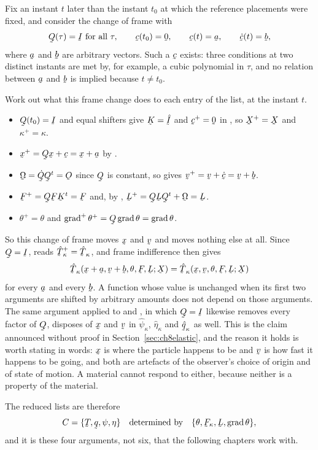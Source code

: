\begin{remark}\label{rem:ch8noxv}
Fix an instant $t$ later than the instant $t_{0}$ at which the reference
placements were fixed, and consider the change of frame with
\[
   \bQ(\tau)=\I\ \text{for all }\tau,
   \qquad
   \bc(t_{0})=\bze,\qquad
   \bc(t)=\ba,\qquad
   \dot\bc(t)=\bb ,
\]
where $\ba$ and $\bb$ are arbitrary vectors. Such a $\bc$ exists: three
conditions at two distinct instants are met by, for example, a cubic
polynomial in $\tau$, and no relation between $\ba$ and $\bb$ is
implied because $t\neq t_{0}$.

Work out what this frame change does to each entry of the list, at the
instant $t$.
\begin{itemize}\itemsep1pt
\item $\bQ(t_{0})=\I$ and equal shifters give $\bK=\hI$ and
      $\bc^{+}=\bze$ in , so $\bX^{+}=\bX$ and
      $\kappa^{+}=\kappa$.
\item $\bx^{+}=\bQ\bx+\bc=\bx+\ba$ by .
\item $\bOm=\dot\bQ\bQ^{t}=\Ob$ since $\bQ$ is constant, so 
      gives $\bv^{+}=\bv+\dot\bc=\bv+\bb$.
\item $\bF^{+}=\bQ\bF\bK^{t}=\bF$ and, by ,
      $\bL^{+}=\bQ\bL\bQ^{t}+\bOm=\bL$.
\item $\theta^{+}=\theta$ and $\grad^{+}\theta^{+}=\bQ\grad\theta
      =\grad\theta$.
\end{itemize}
So this change of frame moves $\bx$ and $\bv$ and moves nothing else at
all. Since $\bQ=\I$,  reads $\hat\bT^{+}_{\kappa}=
\hat\bT_{\kappa}$, and frame indifference then gives
\[
   \hat\bT_{\kappa}(\bx+\ba,\bv+\bb,\theta,\bF,\bL;\bX)
   =\hat\bT_{\kappa}(\bx,\bv,\theta,\bF,\bL;\bX)
\]
for every $\ba$ and every $\bb$. A function whose value is unchanged
when its first two arguments are shifted by arbitrary amounts does not
depend on those arguments. The same argument applied to  and
, in which $\bQ=\I$ likewise removes every factor of $\bQ$,
disposes of $\bx$ and $\bv$ in $\hat\psi_{\kappa}$,
$\hat\eta_{\kappa}$ and $\hat\bq_{\kappa}$ as well. This is the claim
announced without proof in Section~\ref{sec:ch8elastic}, and the reason
it holds is worth stating in words: $\bx$ is where the particle
happens to be and $\bv$ is how fast it happens to be going, and both are
artefacts of the observer's choice of origin and of state of motion. A
material cannot respond to either, because neither is a property of the
material.

The reduced lists are therefore
\[
   C=\{\bT,\bq,\psi,\eta\}
   \quad\text{determined by}\quad
   \{\theta,\bF_{\kappa},\bL,\grad\theta\},
\]
and it is these four arguments, not six, that the following chapters
work with.
\end{remark}

